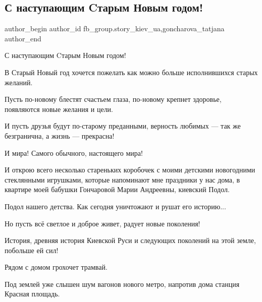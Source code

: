  
 
 
 
 
 
\subsection{С наступающим Cтарым Новым годом!}
\label{sec:14_01_2022.fb.fb_group.story_kiev_ua.1.staryj_novyj_god}
 
\ifcmt
 author_begin
   author_id fb_group.story_kiev_ua,goncharova_tatjana
 author_end
\fi

С наступающим Cтарым Новым годом!

В Старый Новый год хочется пожелать как можно больше исполнившихся старых
желаний. 


Пусть по-новому блестят счастьем глаза, по-новому крепнет здоровье, появляются
новые желания и цели. 

И пусть друзья будут по-старому преданными, верность любимых — так же
безгранична, а жизнь — прекрасна! 

И мира! Самого обычного, настоящего мира!

И открою всего несколько стареньких коробочек с моими детскими новогодними
стеклянными игрушками, которые напоминают мне праздники у нас дома, в квартире
моей бабушки Гончаровой Марии Андреевны, киевский Подол.

Подол нашего детства. Как сегодня уничтожают и рушат его историю...

Но пусть всё светлое и доброе живет, радует новые поколения!

История, древняя история Киевской Руси и следующих поколений на этой земле,
побольше ей сил!


Рядом с домом грохочет трамвай.

Под землей уже слышен шум вагонов нового метро, напротив дома станция Красная
площадь.

